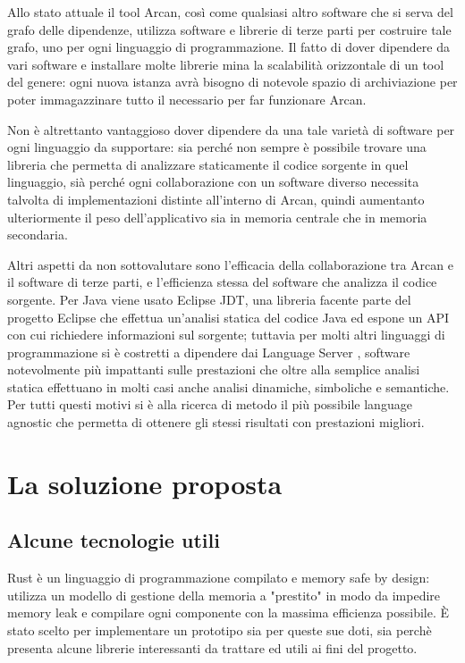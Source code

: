 Allo stato attuale il tool Arcan, cos\`i come qualsiasi altro software che si serva del grafo delle dipendenze, utilizza software e librerie di terze parti per costruire tale grafo, uno per ogni linguaggio di programmazione. Il fatto di dover dipendere da vari software e installare molte librerie mina la scalabilit\`a orizzontale di un tool del genere: ogni nuova istanza avr\`a bisogno di notevole spazio di archiviazione per poter immagazzinare tutto il necessario per far funzionare Arcan.

Non \`e altrettanto vantaggioso dover dipendere da una tale variet\`a di software per ogni linguaggio da supportare: sia perch\'e non sempre \`e possibile trovare una libreria che permetta di analizzare staticamente il codice sorgente in quel linguaggio, si\`a perch\'e ogni collaborazione con un software diverso necessita talvolta di implementazioni distinte all'interno di Arcan, quindi aumentanto ulteriormente il peso dell'applicativo sia in memoria centrale che in memoria secondaria.

Altri aspetti da non sottovalutare sono l'efficacia della collaborazione tra Arcan e il software di terze parti, e l'efficienza stessa del software che analizza il codice sorgente. Per Java viene usato Eclipse JDT, una libreria facente parte del progetto Eclipse che effettua un'analisi statica del codice Java ed espone un API con cui richiedere informazioni sul sorgente; tuttavia per molti altri linguaggi di programmazione si \`e costretti a dipendere dai Language Server \cite{LanguageServer}, software notevolmente pi\`u impattanti sulle prestazioni che oltre alla semplice analisi statica effettuano in molti casi anche analisi dinamiche, simboliche e semantiche. Per tutti questi motivi si \`e alla ricerca di metodo il pi\`u possibile language agnostic che permetta di ottenere gli stessi risultati con prestazioni migliori.

\section{La soluzione proposta}
\subsection{Alcune tecnologie utili}


Rust \cite{blandy2017programming} \`e un linguaggio di programmazione compilato e memory safe by design: utilizza un modello di gestione della memoria a "prestito" in modo da impedire memory leak e compilare ogni componente con la massima efficienza possibile. \`E stato scelto per implementare un prototipo sia per queste sue doti, sia perch\`e presenta alcune librerie interessanti da trattare ed utili ai fini del progetto.

